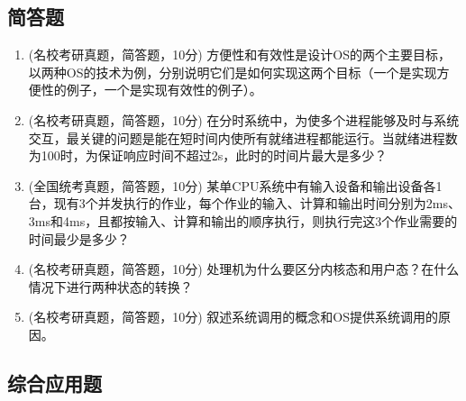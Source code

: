 \documentclass[lang=cn,newtx,10pt,scheme=chinese]{../../elegantbook}
\begin{document}
\subsection{简答题}
\begin{enumerate}
    \item (名校考研真题，简答题，10分) 方便性和有效性是设计OS的两个主要目标，以两种OS的技术为例，分别说明它们是如何实现这两个目标（一个是实现方便性的例子，一个是实现有效性的例子）。

    \item (名校考研真题，简答题，10分) 在分时系统中，为使多个进程能够及时与系统交互，最关键的问题是能在短时间内使所有就绪进程都能运行。当就绪进程数为100时，为保证响应时间不超过2s，此时的时间片最大是多少？

    \item (全国统考真题，简答题，10分) 某单CPU系统中有输入设备和输出设备各1台，现有3个并发执行的作业，每个作业的输入、计算和输出时间分别为2ms、3ms和4ms，且都按输入、计算和输出的顺序执行，则执行完这3个作业需要的时间最少是多少？

    \item (名校考研真题，简答题，10分) 处理机为什么要区分内核态和用户态？在什么情况下进行两种状态的转换？

    \item (名校考研真题，简答题，10分) 叙述系统调用的概念和OS提供系统调用的原因。
\end{enumerate}
\subsection{综合应用题}
\end{document}
